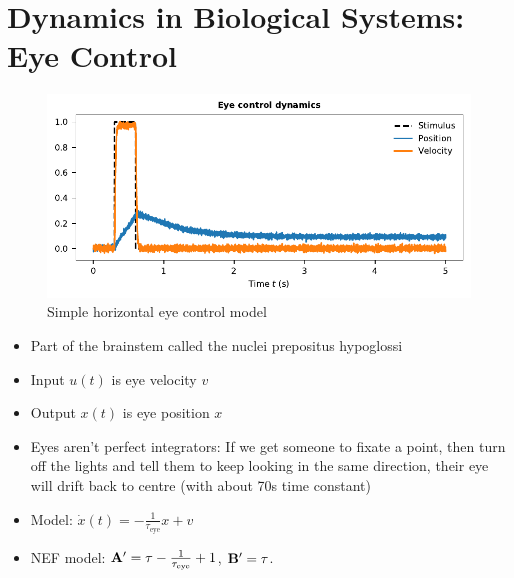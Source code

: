 \documentclass[10pt,letterpaper,oneside]{article}
\begin{document}
\section{Dynamics in Biological Systems: Eye Control}

\ConstructionSite

\begin{figure}
	\centering
	\includegraphics{media/example_eye_control.pdf}
	\caption{Simple horizontal eye control model}
\end{figure}

\begin{itemize}
	\item Part of the brainstem called the nuclei prepositus hypoglossi
	\item Input $u(t)$ is eye velocity $v$
	\item Output $x(t)$ is eye position $x$
	\item Eyes aren't perfect integrators: If we get someone to fixate a point, then turn off the lights and tell them to keep looking in the same direction, their eye will drift back to centre (with about 70s time constant)
	\item Model: $\dot x(t) = - \frac{1}{\tau_\mathrm{eye}} x + v$
	\item NEF model: ${\mathbf{A}}' = \tau - \frac{1}{\tau_\mathrm{eye}} + 1$, ${\mathbf{B}}' = \tau$.
\end{itemize}

\printbibliography
\end{document}
